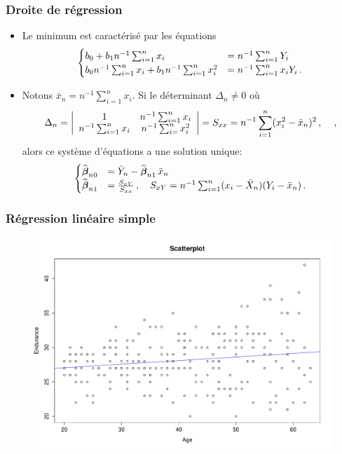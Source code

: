 \begin{frame}
\frametitle{Droite de régression}
\begin{itemize}
\item  Le minimum est caractérisé par les équations
\[
\begin{cases}
b_0 + b_1 n^{-1} \sum_{i=1}^n x_i &= n^{-1} \sum_{i=1}^n Y_i \\
b_0 n^{-1} \sum_{i=1}^n x_i + b_1 n^{-1} \sum_{i=1}^n x_i^2 &= n^{-1} \sum_{i=1}^n x_i Y_i \,.
\end{cases}
\]
\item Notons $\bar{x}_n = n^{-1} \sum_{i=1}^n x_i$. Si le déterminant $\Delta_n \ne 0$ où
\[
\Delta_n = \left|
                 \begin{array}{cc}
                   1 & n^{-1} \sum_{i=1}^n x_i \\
                   n^{-1} \sum_{i=1}^n x_i &  n^{-1} \sum_{i=}^n x_i^2 \\
                 \end{array}
\right| = S_{xx} = n^{-1} \sum_{i=1}^n (x_i^2 - \bar{x}_n)^2 \,,  \quad  \,,
\]
alors ce système d'équations a une solution unique:
\[
\begin{cases}
\operatorname{\widehat{\boldsymbol{\beta}}_n}_0 &= \bar{Y}_n - \operatorname{\widehat{\boldsymbol{\beta}}_n}_1 \bar{x}_n  \\
\operatorname{\widehat{\boldsymbol{\beta}}_n}_1 &= \frac{S_{xY}}{S_{xx}} \,, \quad S_{xY}= n^{-1} \sum_{i=1}^n (x_i - \bar{X}_n) (Y_i - \bar{x}_n) \,.
\end{cases}
\]
\end{itemize}
\end{frame}

\begin{frame}
\frametitle{Régression linéaire simple}
\begin{figure}[h]
\begin{center}
\includegraphics[width=0.9\textheight]{ScatterPlotEnduranceAge}
\end{center}
\end{figure}
\end{frame}

